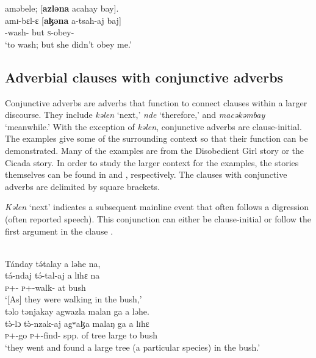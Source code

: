 \medskip
aməbele;  [\textbf{azləna}  acahay  bay].\\
\gll amɪ-bɛl-ɛ [\textbf{aɮəna} a-tsah-aj baj]\\
     {\DEP}-wash-{\CL}      but    \textsc{s}-obey-{\CL}  {\NEG}\\
\glt  ‘to wash; but she didn’t obey me.’ 
\z 

\subsection{Adverbial clauses with conjunctive adverbs}\label{sec:12.3.4}
\hypertarget{RefHeading1213501525720847}{}
Conjunctive adverbs are adverbs that function to connect clauses within a larger  discourse. They include \textit{kəlen} ‘next,’ \textit{nde} ‘therefore,’ and \textit{macəkəmbay} ‘meanwhile.’ With the exception of \textit{kəlen}, conjunctive adverbs are clause-initial. The examples give some of the surrounding context so that their function can be demonstrated. Many of the examples are from the Disobedient Girl story or the Cicada story. In order to study the larger context for the examples, the stories themselves can be found in   and , respectively. The clauses with conjunctive adverbs are delimited by square brackets.

\textit{Kəlen} ‘next’ indicates a subsequent mainline event that often follows a digression (often reported speech). This conjunction can either be clause-initial  or follow the first argument in the clause .  

\ea \label{ex:12:56}
\\
Tánday  t\'{ə}talay  a  ləhe  na,\\    
\gll  tá-ndaj t\'{ə}-tal-aj a lɪhɛ  na\\  
      \textsc{p}+{\IFV}-{\PROG}   \textsc{p}+{\IFV}-walk-{\CL}     at   bush   {\PSP} \\          
\glt ‘[As] they were walking in the bush,’\\

\medskip
\clearpage
təlo  tənjakay  agwazla  malan  ga  a  ləhe.\\
\gll t\`{ə}-lɔ t\`{ə}-nzak-aj agʷaɮa malaŋ ga a lɪhɛ \\
     \textsc{p}+{\PFV}-go   \textsc{p}+{\PFV}-find-{\CL}   {spp. of tree}    large   {\ADJ}      to   bush \\
\glt ‘they went and found a large tree (a particular species) in the bush.’\\

